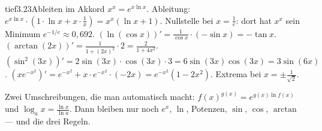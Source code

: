 \begin{loesungkarte}{tief}{3.23}{Ableiten im Akkord}
$x^{x} = e^{x\ln x}$. Ableitung: $e^{x\ln x}\cdot(1\cdot\ln x + x\cdot\frac1x) = x^{x}(\ln x + 1)$. Nullstelle bei $x = \frac1e$: dort hat $x^{x}$ sein Minimum $e^{-1/e}\approx0{,}692$.
$(\ln(\cos x))' = \frac1{\cos x}\cdot(-\sin x) = -\tan x$.
$(\arctan(2x))' = \frac1{1 + (2x)^{2}}\cdot2 = \frac2{1 + 4x^{2}}$.
$(\sin^{2}(3x))' = 2\sin(3x)\cdot\cos(3x)\cdot3 = 6\sin(3x)\cos(3x) = 3\sin(6x)$.
$(xe^{-x^{2}})' = e^{-x^{2}} + x\cdot e^{-x^{2}}\cdot(-2x) = e^{-x^{2}}(1 - 2x^{2})$. Extrema bei $x = \pm\frac1{\sqrt2}$.
\begin{mitnehmen}\kastentext
Zwei Umschreibungen, die man automatisch macht: $f(x)^{g(x)} = e^{g(x)\ln f(x)}$ und $\log_a x = \frac{\ln x}{\ln a}$. Dann bleiben nur noch $e^{x}$, $\ln$, Potenzen, $\sin$, $\cos$, $\arctan$ --- und die drei Regeln.
\end{mitnehmen}
\end{loesungkarte}

